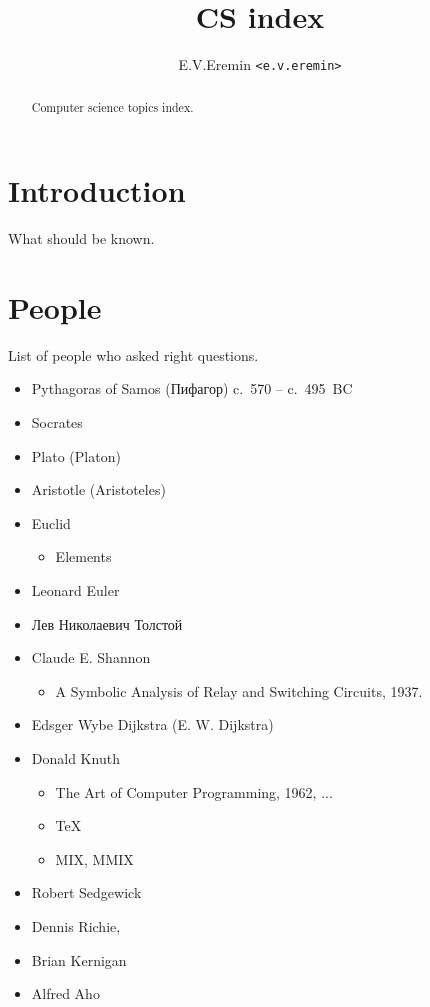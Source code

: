 \documentclass[12pt,a4paper]{article}
\begin{document}
\title{CS index}
\author{E.V.Eremin \texttt{<e.v.eremin>}}

\maketitle

\begin{abstract}
Computer science topics index.
\end{abstract}

\section{Introduction}

What should be known.

\section{People}

List of people who asked right questions.

\begin{itemize}
\item Pythagoras of Samos (Пифагор) c.~570 – c.~495~BC
\item Socrates
\item Plato (Platon)
\item Aristotle (Aristoteles)
\item Euclid
	\begin{itemize}
	\item Elements
	\end{itemize}
\item Leonard Euler
\item Лев Николаевич Толстой
\item Claude E. Shannon
	\begin{itemize}
	\item A Symbolic Analysis of Relay and Switching Circuits, 1937.
	\end{itemize}
\item Edsger Wybe Dijkstra (E. W. Dijkstra)
\item Donald Knuth
	\begin{itemize}
	\item The Art of Computer Programming, 1962, ...
	\item \TeX
	\item MIX, MMIX
	\end{itemize}
\item Robert Sedgewick
\item Dennis Richie,
\item Brian Kernigan
\item Alfred Aho
\end{itemize}
\end{document}

